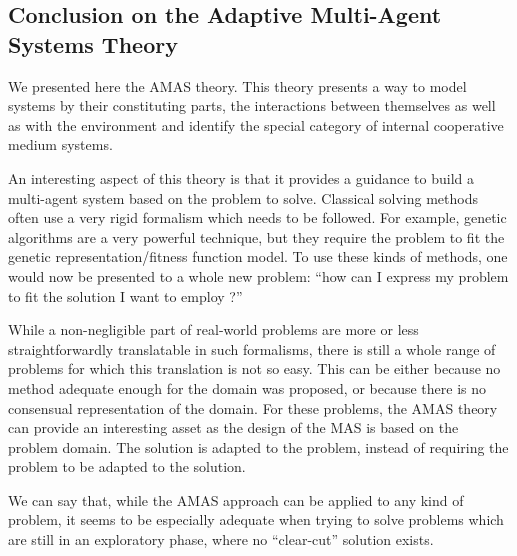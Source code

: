 \subsection{Conclusion on the Adaptive Multi-Agent Systems Theory}

We presented here the AMAS theory. This theory presents a way to model systems by their constituting parts, the interactions between themselves as well as with the environment and identify the special category of internal cooperative medium systems.

An interesting aspect of this theory  is that it provides a guidance to build a multi-agent system based on the problem to solve. Classical solving methods often use a very rigid formalism which needs to be followed. For example, genetic algorithms are a very powerful technique, but they require the problem to fit the genetic representation/fitness function model. To use these kinds of methods, one would now be presented to a whole new problem: \enquote{how can I express my problem to fit the solution I want to employ ?}

While a non-negligible part of real-world problems are more or less straightforwardly translatable in such formalisms, there is still a whole range of problems for which this translation is not so easy. This can be either because no method adequate enough for the domain was proposed, or because there is no consensual representation of the domain. For these problems, the AMAS theory can provide an interesting asset as the design of the MAS is based on the problem domain. The solution is adapted to the problem, instead of requiring the problem to be adapted to the solution.

We can say that, while the AMAS approach can be applied to any kind of problem, it seems to be especially adequate when trying to solve problems which are still in an exploratory phase, where no \enquote{clear-cut} solution exists.


